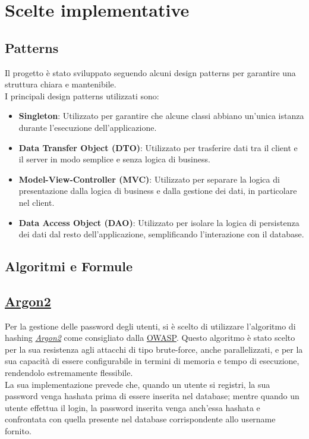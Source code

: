 \section{Scelte implementative}

\subsection{Patterns}
Il progetto è stato sviluppato seguendo alcuni design patterns
per garantire una struttura chiara e mantenibile.\\
I principali
design patterns utilizzati sono:
\begin{itemize}
    \item \textbf{Singleton}: Utilizzato per garantire che alcune 
    classi abbiano un'unica istanza durante l'esecuzione dell'applicazione.
    \item \textbf{Data Transfer Object (DTO)}: Utilizzato per
    trasferire dati tra il client e il server in modo semplice e
    senza logica di business.
    \item \textbf{Model-View-Controller (MVC)}: Utilizzato per
    separare la logica di presentazione dalla logica di business
    e dalla gestione dei dati, in particolare nel client.
    \item \textbf{Data Access Object (DAO)}: Utilizzato per isolare
    la logica di persistenza dei dati dal resto dell'applicazione,
    semplificando l'interazione con il database.
\end{itemize}

\subsection{Algoritmi e Formule}

\subsection{\href{https://github.com/p-h-c/phc-winner-argon2}{Argon2}}
Per la gestione delle password degli utenti, si è scelto di utilizzare
l'algoritmo di hashing \href{https://github.com/p-h-c/phc-winner-argon2}{\textit{Argon2}} come consigliato dalla
\href{https://owasp.org}{OWASP}.
Questo algoritmo è stato scelto per la sua resistenza agli attacchi 
di tipo brute-force, anche parallelizzati, e per la sua capacità di essere configurabile
in termini di memoria e tempo di esecuzione, rendendolo estremamente flessibile.\\
La sua implementazione prevede che, quando un utente si registri, 
la sua password venga hashata prima di essere inserita nel database;
mentre quando un utente effettua il login, la password inserita
venga anch'essa hashata e confrontata con quella presente nel database
corrispondente allo username fornito.

